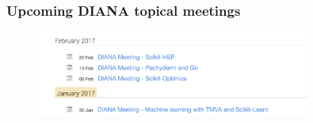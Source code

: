 \begin{frame}
\frametitle{Upcoming DIANA topical meetings}

\begin{figure}[htbp]
\begin{center}
\includegraphics[width=0.8\textwidth]{images/20170110-diana-upcoming.png}
\end{center}
\end{figure}

\end{frame}


